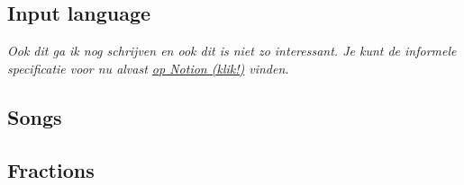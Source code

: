 \documentclass[a4paper]{article}
\begin{document}
\begin{appendices}

\section{Input language}
\label{input}

\textit{\color{red}Ook dit ga ik nog schrijven en ook dit is niet zo interessant. Je kunt de informele specificatie voor nu alvast \href{https://flashy-suit-0e2.notion.site/C-parser-bouwen-e9ba52712772466d846865649184b58f}{op Notion (klik!)} vinden.}
\subsection{Songs}
\label{input_songs}
\subsection{Fractions}
\label{input_fractions}

\end{appendices}
\end{document}
